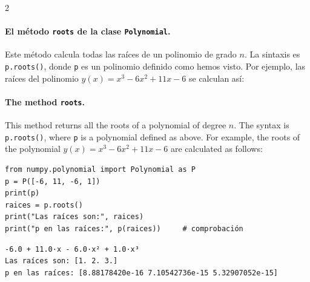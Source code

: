 \begin{paracol}{2}
\paragraph{El método \texttt{roots} de la clase \texttt{Polynomial}.}  Este método calcula todas las raíces de un polinomio de grado $n$. La sintaxis es \texttt{p.roots()}, donde \texttt{p} es un polinomio definido como hemos visto. Por ejemplo, las raíces del polinomio $y(x)=x^3-6x^2+11x-6$ se calculan así:

\switchcolumn
\paragraph{The method \texttt{roots}.} This method returns all the roots of a polynomial of degree $n$. The syntax is \texttt{p.roots()}, where \texttt{p} is a polynomial defined as above. For example, the roots of the polynomial $y(x)=x^3-6x^2+11x-6$ are calculated as follows:
\end{paracol}

\begin{verbatim}
from numpy.polynomial import Polynomial as P
p = P([-6, 11, -6, 1])
print(p)
raices = p.roots()
print("Las raíces son:", raices)
print("p en las raíces:", p(raices))     # comprobación
\end{verbatim}
\begin{verbatim}
-6.0 + 11.0·x - 6.0·x² + 1.0·x³
Las raíces son: [1. 2. 3.]
p en las raíces: [8.88178420e-16 7.10542736e-15 5.32907052e-15]
\end{verbatim}

